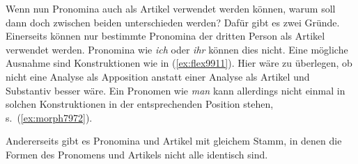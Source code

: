 \begin{exe}
  \ex \label{ex:flex7971}
  \begin{xlist}
  \end{xlist}
\end{exe}



Wenn nun Pronomina auch als Artikel verwendet werden können, warum soll dann doch zwischen beiden unterschieden werden?
Dafür gibt es zwei Gründe.
Einerseits können nur bestimmte Pronomina der dritten Person als Artikel verwendet werden.
Pronomina wie \textit{ich} oder \textit{ihr} können dies \zB nicht.
Eine mögliche Ausnahme sind Konstruktionen wie in (\ref{ex:flex9911}).
Hier wäre zu überlegen, ob nicht eine Analyse als Apposition anstatt einer Analyse als Artikel und Substantiv besser wäre.
Ein Pronomen wie \textit{man} kann allerdings nicht einmal in solchen Konstruktionen in der entsprechenden Position stehen, s.\ (\ref{ex:morph7972}).

\begin{exe}
  \ex\label{ex:flex9911}
  \begin{xlist}
  \end{xlist}
  \ex \label{ex:morph7972}
  \begin{xlist}
  \end{xlist}
\end{exe}

Andererseits gibt es Pronomina und Artikel mit gleichem Stamm, in denen die Formen des Pronomens und Artikels nicht alle identisch sind.

\begin{exe}
  \ex \label{ex:flex7973}
  \begin{xlist}
  \end{xlist}
  \ex \label{ex:flex7974}
  \begin{xlist}
  \end{xlist}
  \ex \label{ex:flex7975}
  \begin{xlist}
  \end{xlist}
\end{exe}

